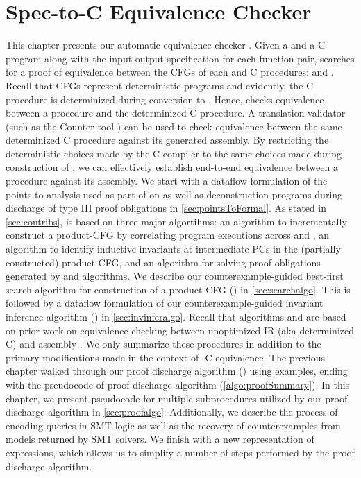 \chapter{Spec-to-C Equivalence Checker}
\label{sec:spectocalgo}
This chapter presents our automatic equivalence checker \toolName{}.
Given a \SpecL{} and a C program along with the input-output specification for each function-pair,
\toolName{} searches for a proof of equivalence between the CFGs of each \SpecL{} and C procedures: \sprog{} and \cprog{}.
Recall that CFGs represent deterministic programs and evidently, the C procedure is determinized during conversion to \cprog{}.
Hence, \toolName{} checks equivalence between a \SpecL{} procedure and the determinized C procedure.
A translation validator (such as the Counter tool \cite{oopsla20}) can be used to check equivalence between
the same determinized C procedure against its generated assembly.
By restricting the deterministic choices made by the C compiler to the same choices made during construction of \cprog{},
we can effectively establish end-to-end equivalence between a \SpecL{} procedure against its assembly.
We start with a dataflow formulation of the points-to analysis used as part of \toolName{} on \cprog{} as well as
deconstruction programs during discharge of type III proof obligations in \cref{sec:pointsToFormal}.
As stated in \cref{sec:contribs}, \toolName{} is based on three major algortihms:
 an algorithm to incrementally construct a product-CFG by correlating program executions across
\sprog{} and \cprog{},
 an algorithm to identify inductive invariants at intermediate PCs in the (partially constructed)
product-CFG, and
 an algorithm for solving proof obligations generated by  and  algorithms.
We describe our counterexample-guided best-first search algorithm for construction of a product-CFG () in \cref{sec:searchalgo}.
This is followed by a dataflow formulation of our counterexample-guided invariant inference algorithm () in \cref{sec:invinferalgo}.
Recall that algorithms  and  are based on prior work on equivalence checking between unoptimized IR (aka determinized C)
and assembly \cite{shubhanipdhthesis}.
We only summarize these procedures in addition to the primary modifications made in the context of \SpecL{}-C equivalence.
The previous chapter walked through our proof discharge algorithm () using examples, ending with
the pseudocode of proof discharge algorithm (\cref{algo:proofSummary}).
In this chapter, we present pseudocode for multiple subprocedures utilized by our proof discharge algorithm in \cref{sec:proofalgo}.
Additionally, we describe the process of encoding queries in SMT logic as well as the recovery of counterexamples from models returned by SMT solvers.
We finish with a new representation of expressions, which allows us to simplify a number of steps performed
by the proof discharge algorithm.

